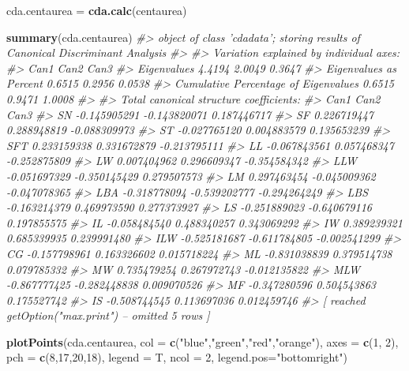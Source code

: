 \documentclass[
]{article}
\newenvironment{Shaded}{\begin{snugshade}}{\end{snugshade}}
\newcommand{\CommentTok}[1]{\textcolor[rgb]{0.56,0.35,0.01}{\textit{#1}}}
\newcommand{\DataTypeTok}[1]{\textcolor[rgb]{0.13,0.29,0.53}{#1}}
\newcommand{\DecValTok}[1]{\textcolor[rgb]{0.00,0.00,0.81}{#1}}
\newcommand{\KeywordTok}[1]{\textcolor[rgb]{0.13,0.29,0.53}{\textbf{#1}}}
\newcommand{\NormalTok}[1]{#1}
\newcommand{\StringTok}[1]{\textcolor[rgb]{0.31,0.60,0.02}{#1}}
\begin{document}
\begin{Shaded}
\begin{Highlighting}[]
\NormalTok{cda.centaurea =}\StringTok{ }\KeywordTok{cda.calc}\NormalTok{(centaurea)}

\KeywordTok{summary}\NormalTok{(cda.centaurea)}
\CommentTok{#> object of class 'cdadata'; storing results of Canonical Discriminant Analysis}
\CommentTok{#> }
\CommentTok{#> Variation explained by individual axes:}
\CommentTok{#>                                        Can1   Can2   Can3}
\CommentTok{#> Eigenvalues                          4.4194 2.0049 0.3647}
\CommentTok{#> Eigenvalues as Percent               0.6515 0.2956 0.0538}
\CommentTok{#> Cumulative Percentage of Eigenvalues 0.6515 0.9471 1.0008}
\CommentTok{#> }
\CommentTok{#> Total canonical structure coefficients:}
\CommentTok{#>             Can1         Can2         Can3}
\CommentTok{#> SN  -0.145905291 -0.143820071  0.187446717}
\CommentTok{#> SF   0.226719447  0.288948819 -0.088309973}
\CommentTok{#> ST  -0.027765120  0.004883579  0.135653239}
\CommentTok{#> SFT  0.233159338  0.331672879 -0.213795111}
\CommentTok{#> LL  -0.067843561  0.057468347 -0.252875809}
\CommentTok{#> LW   0.007404962  0.296609347 -0.354584342}
\CommentTok{#> LLW -0.051697329 -0.350145429  0.279507573}
\CommentTok{#> LM   0.297463454 -0.045009362 -0.047078365}
\CommentTok{#> LBA -0.318778094 -0.539202777 -0.294264249}
\CommentTok{#> LBS -0.163214379  0.469973590  0.277373927}
\CommentTok{#> LS  -0.251889023 -0.640679116  0.197855575}
\CommentTok{#> IL  -0.058484540  0.488340257  0.343069292}
\CommentTok{#> IW   0.389239321  0.685339935  0.239991480}
\CommentTok{#> ILW -0.525181687 -0.611784805 -0.002541299}
\CommentTok{#> CG  -0.157798961  0.163326602  0.015718224}
\CommentTok{#> ML  -0.831038839  0.379514738  0.079785332}
\CommentTok{#> MW   0.735479254  0.267972743 -0.012135822}
\CommentTok{#> MLW -0.867777425 -0.282448838  0.009070526}
\CommentTok{#> MF  -0.347280596  0.504543863  0.175527742}
\CommentTok{#> IS  -0.508744545  0.113697036  0.012459746}
\CommentTok{#>  [ reached getOption("max.print") -- omitted 5 rows ]}

\KeywordTok{plotPoints}\NormalTok{(cda.centaurea, }\DataTypeTok{col =} \KeywordTok{c}\NormalTok{(}\StringTok{"blue"}\NormalTok{,}\StringTok{"green"}\NormalTok{,}\StringTok{"red"}\NormalTok{,}\StringTok{"orange"}\NormalTok{), }\DataTypeTok{axes =} \KeywordTok{c}\NormalTok{(}\DecValTok{1}\NormalTok{, }\DecValTok{2}\NormalTok{),}
           \DataTypeTok{pch =} \KeywordTok{c}\NormalTok{(}\DecValTok{8}\NormalTok{,}\DecValTok{17}\NormalTok{,}\DecValTok{20}\NormalTok{,}\DecValTok{18}\NormalTok{), }\DataTypeTok{legend =}\NormalTok{ T, }\DataTypeTok{ncol =} \DecValTok{2}\NormalTok{, }\DataTypeTok{legend.pos=}\StringTok{"bottomright"}\NormalTok{)}
\end{Highlighting}
\end{Shaded}
\end{document}
